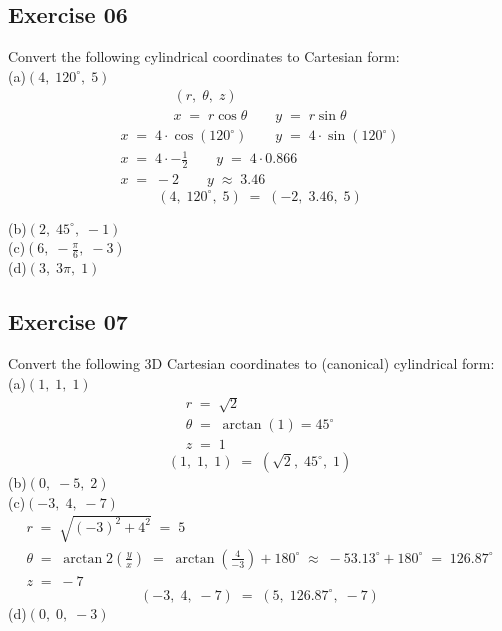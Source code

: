 \documentclass[12pt, a4paper]{article}
\begin{document}
\subsection*{Exercise 06}
Convert the following cylindrical coordinates to
Cartesian form:\\
	(a)\quad$(4,\;120^\circ,\;5)$
		\begin{gather}
			\tag*{}
				(r,\;\theta,\;z)\\
			\tag*{}
				x\;=\;r\cos\theta\qquad y\;=\;r\sin\theta
		\end{gather}
		\begin{gather}
			\tag*{}
				x\;=\;4\cdot\cos(120^\circ)\qquad
				y\;=\;4\cdot\sin(120^\circ)\\
			\tag*{}
				x\;=\;4\cdot-\frac{1}{2}\qquad
				y\;=\;4\cdot0.866\\
			\tag*{}
				x\;=\;-2 \qquad y\;\approx\;3.46
		\end{gather}
		\begin{equation}
			\tag*{}
				(4,\;120^\circ,\;5)\;=\;(-2,\;3.46,\;5)
		\end{equation}
			
	(b)\quad$(2,\;45^\circ,\;-1)$\\
	(c)\quad$\left(6,\;-\frac{\pi}{6},\;-3\right)$\\
	(d)\quad$(3,\;3\pi,\;1)$
	
\subsection*{Exercise 07}
Convert the following 3D Cartesian coordinates to
(canonical) cylindrical form:\\
	(a)\quad$(1,\;1,\;1)$
		\begin{gather}
			\tag*{}
				r\;=\;\sqrt{2}\\
			\tag*{}
				\theta\;=\;\arctan(1)=45^\circ\\
			\tag*{}
				z\;=\;1
		\end{gather}
		\begin{equation}
			\tag*{}
				(1,\;1,\;1)\;=\;(\sqrt{2},\;45^\circ,\;1)
		\end{equation}
	(b)\quad$(0,\;-5,\;2)$\\
	(c)\quad$(-3,\;4,\;-7)$\\
		\begin{gather}
			\tag*{}
				r\;=\;\sqrt{(-3)^2+4^2}\;=\;5\\
			\tag*{}
				\theta\;=\; \arctan2\left(\frac{y}{x}\right)
				\;=\;\arctan(\frac{4}{-3})+180^\circ\;\approx\;
				-53.13^\circ+180^\circ\;=\;126.87^\circ\\
			\tag*{}
				z\;=\;-7
		\end{gather}
		\begin{equation}
			\tag*{}
				(-3,\;4,\;-7)\;=\;(5,\;126.87^\circ,\;-7)
		\end{equation}
	(d)\quad$(0,\;0,\;-3)$
\end{document}
